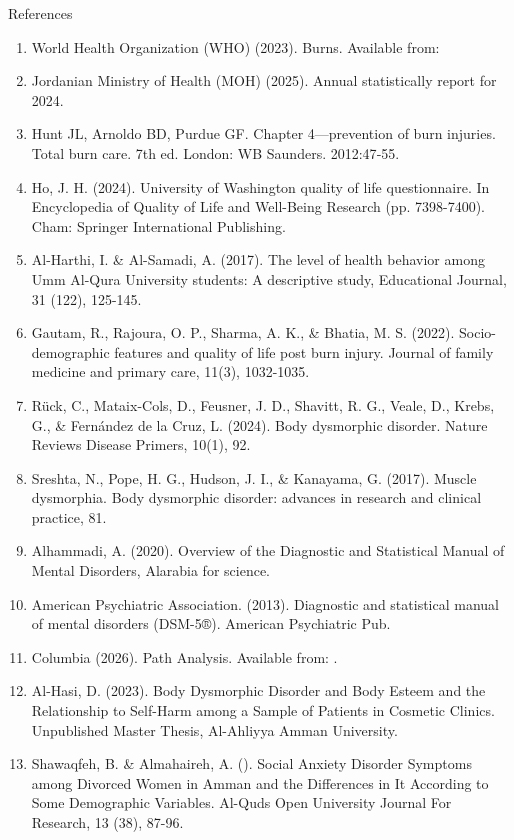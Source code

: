 \documentclass[10pt]{NSP1}
\begin{document}
References

\begin{enumerate}
  \item World Health Organization (WHO) (2023). Burns. Available from: 
  \item Jordanian Ministry of Health (MOH) (2025). Annual statistically report for 2024.
  \item Hunt JL, Arnoldo BD, Purdue GF. Chapter 4—prevention of burn injuries. Total burn care. 7th ed. London: WB Saunders. 2012:47‑55.
  \item Ho, J. H. (2024). University of Washington quality of life questionnaire. In Encyclopedia of Quality of Life and Well-Being Research (pp. 7398-7400). Cham: Springer International Publishing.
  \item Al-Harthi, I. \& Al-Samadi, A. (2017). The level of health behavior among Umm Al-Qura University students: A descriptive study, Educational Journal, 31 (122), 125-145.
  \item Gautam, R., Rajoura, O. P., Sharma, A. K., \& Bhatia, M. S. (2022). Socio-demographic features and quality of life post burn injury. Journal of family medicine and primary care, 11(3), 1032-1035.
  \item Rück, C., Mataix-Cols, D., Feusner, J. D., Shavitt, R. G., Veale, D., Krebs, G., \& Fernández de la Cruz, L. (2024). Body dysmorphic disorder. Nature Reviews Disease Primers, 10(1), 92.
  \item Sreshta, N., Pope, H. G., Hudson, J. I., \& Kanayama, G. (2017). Muscle dysmorphia. Body dysmorphic disorder: advances in research and clinical practice, 81.
  \item Alhammadi, A. (2020). Overview of the Diagnostic and Statistical Manual of Mental Disorders, Alarabia for science.
  \item American Psychiatric Association. (2013). Diagnostic and statistical manual of mental disorders (DSM-5®). American Psychiatric Pub.
  \item Columbia (2026). Path Analysis. Available from: .
  \item Al-Hasi, D. (2023). Body Dysmorphic Disorder and Body Esteem and the Relationship to Self-Harm among a Sample of Patients in Cosmetic Clinics. Unpublished Master Thesis, Al-Ahliyya Amman University.
  \item Shawaqfeh, B. \& Almahaireh, A. (). Social Anxiety Disorder Symptoms among Divorced Women in Amman and the Differences in It According to Some Demographic Variables. Al-Quds Open University Journal For Research, 13 (38), 87-96.

\end{enumerate}
\end{document}
